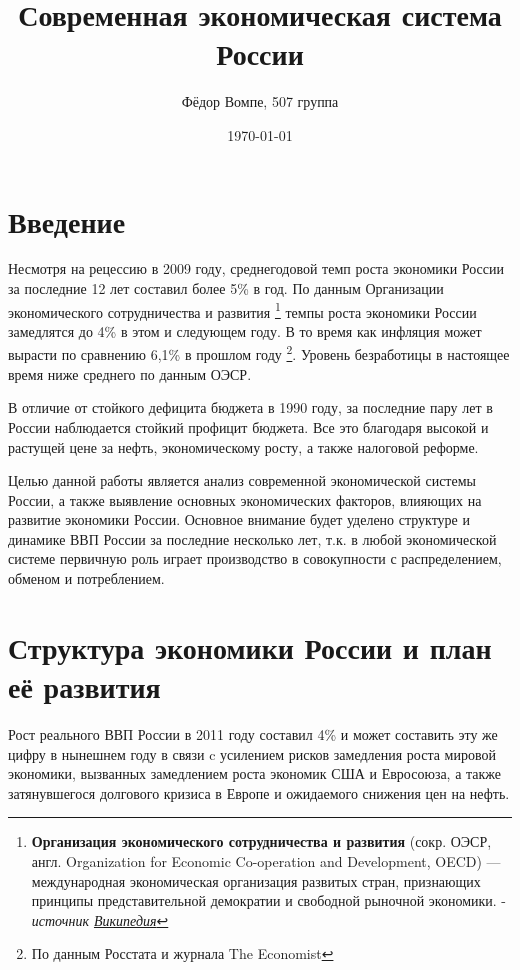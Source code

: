 \documentclass[a4paper,12pt]{article}
\title{Современная экономическая система России} %
\author{Фёдор Вомпе, 507 группа}
\date{\today} %
\begin{document}
\maketitle

\section{Введение}

Несмотря на рецессию в 2009 году, среднегодовой темп роста экономики России за
последние 12 лет составил более 5\% в год\cite{TheEconomist}. По данным
Организации экономического сотрудничества и развития 
\footnote{ \textbf{Организация экономического сотрудничества
и развития} (сокр. ОЭСР, англ. Organization for Economic Co-operation and
Development, OECD) — международная экономическая организация развитых стран,
признающих принципы представительной демократии и свободной рыночной экономики.
- \textit{источник
\href{http://ru.wikipedia.org/wiki/Организация экономического сотрудничества
и развития}{Википедия}} } темпы роста экономики России замедлятся 
до 4\% в этом и следующем году\cite{StandardPoor}. В то время как инфляция может
вырасти по сравнению 6,1\% в прошлом году
\footnote{По данным Росстата\cite{Rosstat} и журнала The
 Economist\cite{TheEconomist}}.
Уровень безработицы в настоящее время ниже среднего по данным ОЭСР.

В отличие от стойкого дефицита бюджета в 1990 году, за последние пару лет
в России наблюдается стойкий профицит бюджета. Все это благодаря
высокой и растущей цене за нефть, экономическому росту, а также
налоговой реформе.

Целью данной работы является анализ современной экономической
системы России, а также выявление основных экономических факторов, влияющих на
развитие экономики России. Основное внимание будет уделено структуре и динамике
ВВП России за последние несколько лет, т.к. в любой экономической системе
первичную роль играет производство в совокупности с распределением, обменом и потреблением.

\section{Структура экономики России и план её развития}

Рост реального ВВП России в 2011 году составил 4\% и может составить эту же
цифру в нынешнем году в связи c усилением рисков замедления роста мировой
экономики, вызванных замедлением роста экономик США и Евросоюза, а также 
затянувшегося долгового кризиса в Европе и ожидаемого снижения цен на
нефть. \cite{WorldBank2011}
\end{document}
